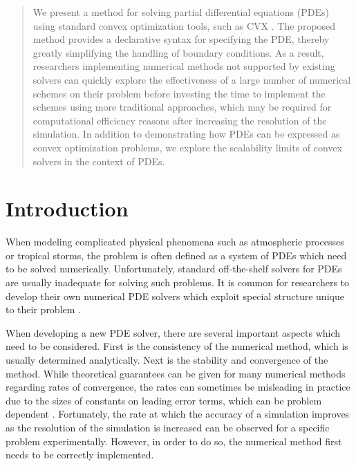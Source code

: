 \documentclass[conference]{IEEEtran}
\begin{document}
\begin{abstract}
  We present a method for solving partial differential equations (PDEs) using standard convex optimization tools, such as CVX \cite{cvx,gb08}. The proposed method provides a declarative syntax for specifying the PDE, thereby greatly simplifying the handling of boundary conditions. As a result, researchers implementing numerical methods not supported by existing solvers can quickly explore the effectiveness of a large number of numerical schemes on their problem before investing the time to implement the schemes using more traditional approaches, which may be required for computational efficiency reasons after increasing the resolution of the simulation. In addition to demonstrating how PDEs can be expressed as convex optimization problems, we explore the scalability limits of convex solvers in the context of PDEs.
\end{abstract}


\section{Introduction}

When modeling complicated physical phenomena such as atmospheric processes or tropical storms, the problem is often defined as a system of PDEs which need to be solved numerically. Unfortunately, standard off-the-shelf solvers for PDEs are usually inadequate for solving such problems. It is common for researchers to develop their own numerical PDE solvers which exploit special structure unique to their problem .

When developing a new PDE solver, there are several important aspects which need to be considered. First is the consistency of the numerical method, which is usually determined analytically. Next is the stability and convergence of the method. While theoretical guarantees can be given for many numerical methods regarding rates of convergence, the rates can sometimes be misleading in practice due to the sizes of constants on leading error terms, which can be problem dependent . Fortunately, the rate at which the accuracy of a simulation improves as the resolution of the simulation is increased can be observed for a specific problem experimentally. However, in order to do so, the numerical method first needs to be correctly implemented.
\end{document}
